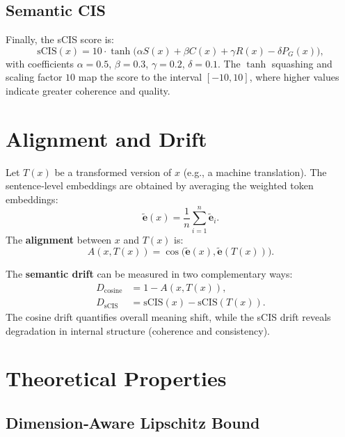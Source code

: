 \documentclass[11pt]{article}
\theoremstyle{definition}
\begin{document}
\subsection{Semantic CIS}
Finally, the sCIS score is:
\begin{equation}
\text{sCIS}(x) = 10 \cdot \tanh\!\Big( \alpha S(x) + \beta C(x) + \gamma R(x) - \delta P_G(x) \Big),
\end{equation}
with coefficients $\alpha=0.5$, $\beta=0.3$, $\gamma=0.2$, $\delta=0.1$. The $\tanh$ squashing and scaling factor $10$ map the score to the interval $[-10,10]$, where higher values indicate greater coherence and quality.

\section{Alignment and Drift}

Let $T(x)$ be a transformed version of $x$ (e.g., a machine translation). The sentence‑level embeddings are obtained by averaging the weighted token embeddings:
\[
\tilde{\mathbf{e}}(x) = \frac{1}{n} \sum_{i=1}^{n} \tilde{\mathbf{e}}_i.
\]
The \textbf{alignment} between $x$ and $T(x)$ is:
\begin{equation}
A(x, T(x)) = \cos\big(\tilde{\mathbf{e}}(x), \tilde{\mathbf{e}}(T(x))\big).
\end{equation}

The \textbf{semantic drift} can be measured in two complementary ways:
\begin{align}
D_{\text{cosine}} &= 1 - A(x, T(x)), \\
D_{\text{sCIS}} &= \text{sCIS}(x) - \text{sCIS}(T(x)).
\end{align}
The cosine drift quantifies overall meaning shift, while the sCIS drift reveals degradation in internal structure (coherence and consistency).

\section{Theoretical Properties}

\subsection{Dimension‑Aware Lipschitz Bound}
\end{document}
